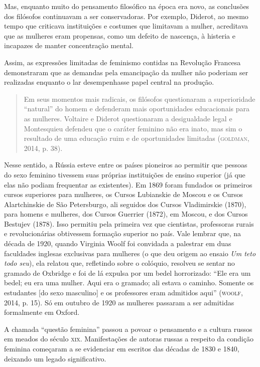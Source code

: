 \documentclass[11pt]{extarticle}
\begin{document}
Mas, enquanto muito do pensamento filosófico na época era novo, as
conclusões dos filósofos continuavam a ser conservadoras. Por exemplo,
Diderot, ao mesmo tempo que criticava instituições e costumes que
limitavam a mulher, acreditava que as mulheres eram propensas, como um
defeito de nascença, à histeria e incapazes de manter concentração
mental.

Assim, as expressões limitadas de feminismo contidas na Revolução
Francesa demonstraram que as demandas pela emancipação da mulher não
poderiam ser realizadas enquanto o lar desempenhasse papel central na
produção.

\begin{quote}
Em seus momentos mais radicais, os filósofos questionaram a
superioridade ``natural'' do homem e defenderam mais oportunidades
educacionais para as mulheres. Voltaire e Diderot questionaram a
desigualdade legal e Montesquieu defendeu que o caráter feminino não era
inato, mas sim o resultado de uma educação ruim e de oportunidades
limitadas (\textsc{goldman}, 2014, p. 38).
\end{quote}

Nesse sentido, a Rússia esteve entre os países pioneiros ao permitir que
pessoas do sexo feminino tivessem suas próprias instituições de ensino
superior (já que elas não podiam frequentar as existentes). Em 1869
foram fundados os primeiros cursos superiores para mulheres, os Cursos
Lubianskie de Moscou e os Cursos Alartchinskie de São Petersburgo, ali
seguidos dos Cursos Vladimirskie (1870), para homens e mulheres, dos
Cursos Guerrier (1872), em Moscou, e dos Cursos Bestujev (1878). Isso
permitiu pela primeira vez que cientistas, professoras rurais e
revolucionárias obtivessem formação superior no país. Vale lembrar que,
na década de 1920, quando Virginia Woolf foi convidada a palestrar em
duas faculdades inglesas exclusivas para mulheres (o que deu origem ao
ensaio \emph{Um teto todo seu}), ela relatou que, refletindo sobre o
colóquio, resolveu se sentar no gramado de Oxbridge e foi de lá expulsa
por um bedel horrorizado: ``Ele era um bedel; eu era uma mulher. Aqui
era o gramado; ali estava o caminho. Somente os estudantes {[}do sexo
masculino{]} e os professores eram admitidos aqui'' (\textsc{woolf}, 2014, p.
15). Só em outubro de 1920 as mulheres passaram a ser admitidas
formalmente em Oxford.

A chamada ``questão feminina'' passou a povoar o pensamento e a cultura
russos em meados do século \textsc{xix}. Manifestações de autoras russas a
respeito da condição feminina começaram a se evidenciar em escritos das
décadas de 1830 e 1840, deixando um legado significativo.
\end{document}
